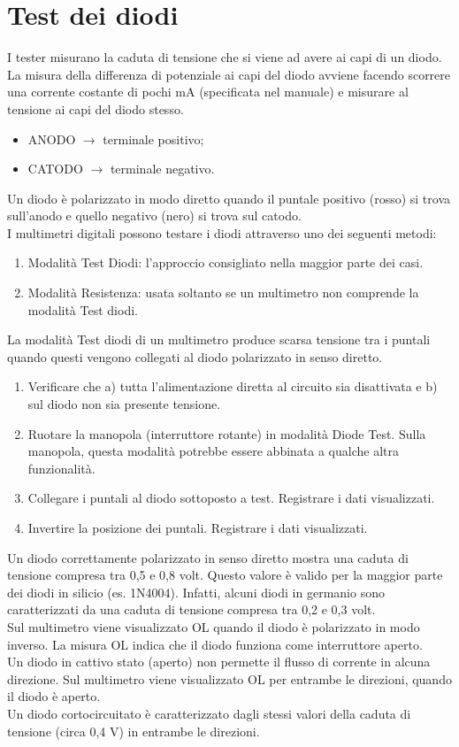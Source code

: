 \documentclass[12pt, letterpaper]{book}
\begin{document}
\section{Test dei diodi}
I tester misurano la caduta di tensione che si viene ad avere ai capi di un diodo.\\
La misura della differenza di potenziale ai capi del diodo avviene facendo scorrere una corrente costante di pochi mA (specificata nel manuale) e misurare al tensione ai capi del diodo stesso.
\begin{itemize}
    \item ANODO $\rightarrow$ terminale positivo;
    \item CATODO $\rightarrow$ terminale negativo.
\end{itemize}
Un diodo è polarizzato in modo diretto quando il puntale positivo (rosso) si trova sull'anodo e quello negativo (nero) si trova sul catodo.\\
I multimetri digitali possono testare i diodi attraverso uno dei seguenti metodi:
\begin{enumerate}
    \item Modalità Test Diodi: l'approccio consigliato nella maggior parte dei casi.
    \item Modalità Resistenza: usata soltanto se un multimetro non comprende la modalità Test diodi.
\end{enumerate}
La modalità Test diodi di un multimetro produce scarsa tensione tra i puntali quando questi vengono collegati al diodo polarizzato in senso diretto.
\begin{enumerate}
    \item Verificare che a) tutta l'alimentazione diretta al circuito sia disattivata e b) sul diodo non sia presente tensione.
    \item Ruotare la manopola (interruttore rotante) in modalità Diode Test. Sulla manopola, questa modalità potrebbe essere abbinata a qualche altra funzionalità.
    \item Collegare i puntali al diodo sottoposto a test. Registrare i dati visualizzati.
    \item Invertire la posizione dei puntali. Registrare i dati visualizzati.
\end{enumerate}
Un diodo correttamente polarizzato in senso diretto mostra una caduta di tensione compresa tra 0,5 e 0,8 volt. Questo valore è valido per la maggior parte dei diodi in silicio (es. 1N4004). Infatti, alcuni diodi in germanio sono caratterizzati da una caduta di tensione compresa tra 0,2 e 0,3 volt.\\
Sul multimetro viene visualizzato OL quando il diodo è polarizzato in modo inverso. La misura OL indica che il diodo funziona come interruttore aperto.\\
Un diodo in cattivo stato (aperto) non permette il flusso di corrente in alcuna direzione. Sul multimetro viene visualizzato OL per entrambe le direzioni, quando il diodo è aperto.\\
Un diodo cortocircuitato è caratterizzato dagli stessi valori della caduta di tensione (circa 0,4 V) in entrambe le direzioni.
\end{document}
